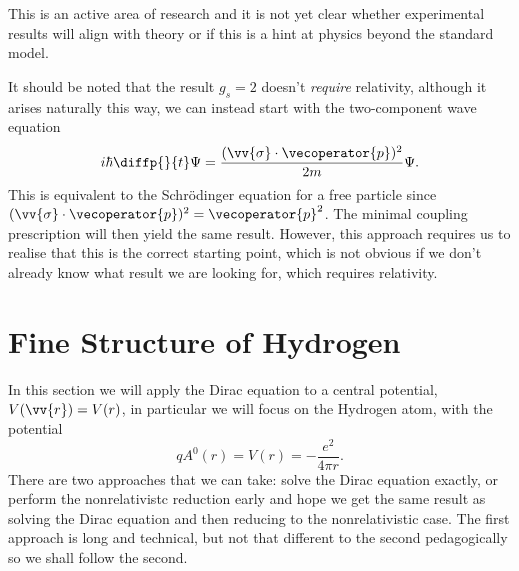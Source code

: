 \documentclass[fleqn]{NotesClass}
\begin{document}
    This is an active area of research and it is not yet clear whether experimental results will align with theory or if this is a hint at physics beyond the standard model.
    
    It should be noted that the result \(g_s = 2\) doesn't \emph{require} relativity, although it arises naturally this way, we can instead start with the two-component wave equation
    \begin{equation}
        i\hbar\diffp{}{t}\Psi = \frac{(\vv{\sigma} \cdot \vecoperator{p})^2}{2m}\Psi.
    \end{equation}
    This is equivalent to the Schr\"odinger equation for a free particle since \((\vv{\sigma} \cdot \vecoperator{p})^2 = \vecoperator{p}^2\).
    The minimal coupling prescription will then yield the same result.
    However, this approach requires us to realise that this is the correct starting point, which is not obvious if we don't already know what result we are looking for, which requires relativity.
    
    \chapter{Fine Structure of Hydrogen}
    In this section we will apply the Dirac equation to a central potential, \(V(\vv{r}) = V(r)\), in particular we will focus on the Hydrogen atom, with the potential
    \begin{equation}
        qA^0(r) = V(r) = -\frac{e^2}{4\pi r}.
    \end{equation}
    There are two approaches that we can take: solve the Dirac equation exactly, or perform the nonrelativistc reduction early and hope we get the same result as solving the Dirac equation and then reducing to the nonrelativistic case.
    The first approach is long and technical, but not that different to the second pedagogically so we shall follow the second.
    
\end{document}
